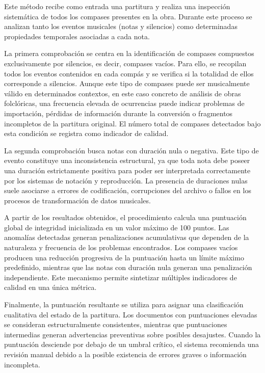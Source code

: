 Este método recibe como entrada una partitura y realiza una inspección sistemática de todos los compases presentes en la obra. Durante este proceso se analizan tanto los eventos musicales (notas y silencios) como determinadas propiedades temporales asociadas a cada nota.

La primera comprobación se centra en la identificación de compases compuestos exclusivamente por silencios, es decir, compases vacíos. Para ello, se recopilan todos los eventos contenidos en cada compás y se verifica si la totalidad de ellos corresponde a silencios. Aunque este tipo de compases puede ser musicalmente válido en determinados contextos, en este caso concreto de análisis de obras folclóricas, una frecuencia elevada de ocurrencias puede indicar problemas de importación, pérdidas de información durante la conversión o fragmentos incompletos de la partitura original. El número total de compases detectados bajo esta condición se registra como indicador de calidad.

La segunda comprobación busca notas con duración nula o negativa. Este tipo de evento constituye una inconsistencia estructural, ya que toda nota debe poseer una duración estrictamente positiva para poder ser interpretada correctamente por los sistemas de notación y reproducción. La presencia de duraciones nulas suele asociarse a errores de codificación, corrupciones del archivo o fallos en los procesos de transformación de datos musicales.

A partir de los resultados obtenidos, el procedimiento calcula una puntuación global de integridad inicializada en un valor máximo de 100 puntos. Las anomalías detectadas generan penalizaciones acumulativas que dependen de la naturaleza y frecuencia de los problemas encontrados. Los compases vacíos producen una reducción progresiva de la puntuación hasta un límite máximo predefinido, mientras que las notas con duración nula generan una penalización independiente. Este mecanismo permite sintetizar múltiples indicadores de calidad en una única métrica.

Finalmente, la puntuación resultante se utiliza para asignar una clasificación cualitativa del estado de la partitura. Los documentos con puntuaciones elevadas se consideran estructuralmente consistentes, mientras que puntuaciones intermedias generan advertencias preventivas sobre posibles desajustes. Cuando la puntuación desciende por debajo de un umbral crítico, el sistema recomienda una revisión manual debido a la posible existencia de errores graves o información incompleta.

